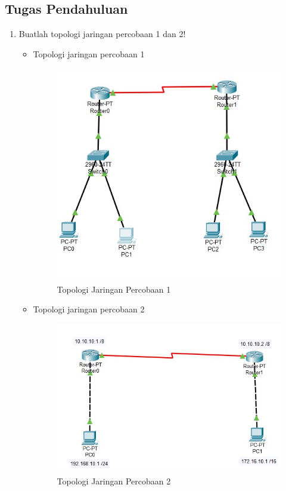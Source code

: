 \subsection{Tugas Pendahuluan}
\begin{enumerate}
	\item Buatlah topologi jaringan percobaan 1 dan 2!
	\begin{itemize}
		\item Topologi jaringan percobaan 1
		\begin{figure}[H]
		\centering
		\includegraphics[width=0.75\linewidth]{P2/img/topologi1.jpg}
		\caption{Topologi Jaringan Percobaan 1}
		\label{fig:gambar31}
		\end{figure}
	
		\item Topologi jaringan percobaan 2
		\begin{figure}[H]
			\centering
			\includegraphics[width=0.75\linewidth]{P2/img/topologi2.jpg}
			\caption{Topologi Jaringan Percobaan 2}
			\label{fig:gambar32}
		\end{figure}
	\end{itemize}
	


\end{enumerate}
